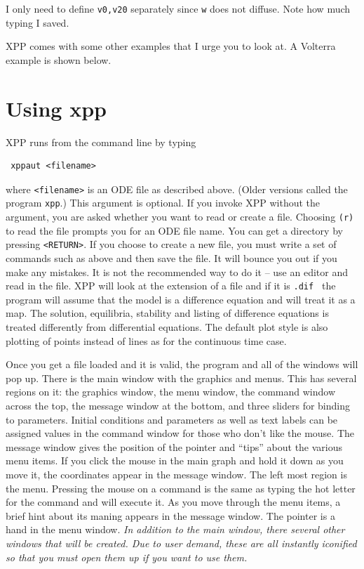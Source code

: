 \documentclass{article}
\newcommand{\bvb}{\begin{verbatim}}
\newcommand{\tc}[1]{\addcontentsline{toc}{subsection}{#1}}
\newcommand{\tcc}[1]{\addcontentsline{toc}{subsubsection}{#1}}
\begin{document}
I only need to define {\tt v0,v20} separately since {\tt w} does not diffuse.
Note how much typing I saved.  




\bigskip











 
  
XPP comes with some other examples that I urge you to look at. A
Volterra example is shown below.

\section{Using xpp}
XPP runs from the command line by typing
\bvb
 xppaut <filename>
\end{verbatim}
where {\tt <filename>} is an ODE file as described above.  (Older versions
called the program {\tt xpp}.)  This argument is optional. 
 If you invoke XPP without the argument, you are asked whether you want to
 read or create a file. Choosing {\tt (r)} to read the file prompts you for an ODE
 file name.  You can get a directory by pressing {\tt <RETURN>}.  If you choose to 
create a new file, you must write a set of commands such as above and then
 save the file.  	It will bounce you out if you make any mistakes. 
 It is not the recommended way to do it -- use an editor and read in the file. 
 XPP will look at the extension of a file and if it is {\tt .dif } the program
 will assume that the model is a difference equation and will treat it as a map. 
 The solution, equilibria, stability and listing of difference equations 
is treated differently from differential equations.  The default plot style 
is also plotting of points instead of lines as for the continuous time case.

\tc{Windows}
\tcc{Main Window}

Once you get a file loaded and it is valid, the program and all of the 
windows will pop up.  There is the main window with the graphics and menus.  
This has several regions on it: the graphics window, the menu window, the command
 window across the top, the message window at the bottom, and three
sliders for binding to parameters.  Initial 
conditions and parameters as well as text labels can be assigned
values in the command window for those who don't like the mouse.  The message 
window gives the position of the pointer and ``tips'' about the
various menu items.  If 
you click the mouse in the main graph and hold it down as you move it, the
coordinates appear in the message window.  The left 
most region is the menu.  Pressing the mouse on a command is the same 
as typing the hot letter for the command and will execute it.  As you
move through the menu items, a brief hint about its maning appears in
the message window. The pointer is 
a hand in the menu window.  {\em In addition to the main window, there
several other windows that will be created.  Due to user demand, these
are all instantly iconified so that you must open them up if you want
to use them.}
\end{document}
